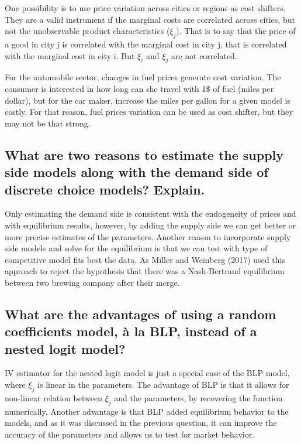 \documentclass[]{article}
\begin{document}
One possibility is to use price variation across cities or regions as
cost shifters. They are a valid instrument if the marginal costs are
correlated across cities, but not the unobservable product
characteristics (\(\xi_j\)). That is to say that the price of a good in
city j is correlated with the marginal cost in city j, that is
correlated with the marginal cost in city i. But \(\xi_i\) and \(\xi_j\)
are not correlated.

For the automobile sector, changes in fuel prices generate cost
variation. The consumer is interested in how long can she travel with
1\$ of fuel (miles per dollar), but for the car maker, increase the
miles per gallon for a given model is costly. For that reason, fuel
prices variation can be used as cost shifter, but they may not be that
strong.

\hypertarget{sec:question5}{%
\subsection{What are two reasons to estimate the supply side models
along with the demand side of discrete choice models?
Explain.}\label{sec:question5}}

Only estimating the demand side is consistent with the endogeneity of
prices and with equilibrium results, however, by adding the supply side
we can get better or more precise estimates of the parameters. Another
reason to incorporate supply side models and solve for the equilibrium
is that we can test with type of competitive model fits best the data.
As Miller and Weinberg (2017) used this approach to reject the
hypothesis that there was a Nash-Bertrand equilibrium between two
brewing company after their merge.

\hypertarget{what-are-the-advantages-of-using-a-random-coefficients-model-a-la-blp-instead-of-a-nested-logit-model}{%
\subsection{What are the advantages of using a random coefficients
model, à la BLP, instead of a nested logit
model?}\label{what-are-the-advantages-of-using-a-random-coefficients-model-a-la-blp-instead-of-a-nested-logit-model}}

IV estimator for the nested logit model is just a special case of the
BLP model, where \(\xi_j\) is linear in the parameters. The advantage of
BLP is that it allows for non-linear relation between \(\xi_j\) and the
parameters, by recovering the function numerically. Another advantage is
that BLP added equilibrium behavior to the models, and as it was
discussed in the previous question, it can improve the accuracy of the
parameters and allows us to test for market behavior.
\end{document}
